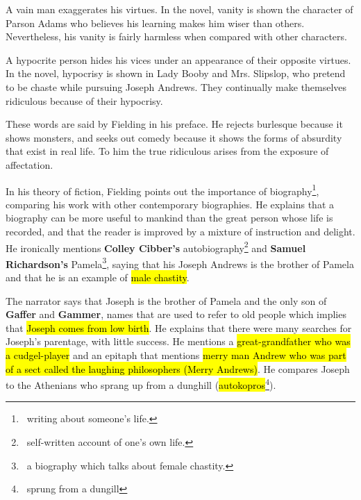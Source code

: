 \documentclass[12pt, a4paper]{article}
\begin{document}

\ind A vain man exaggerates his virtues. In the novel, vanity is shown the character of Parson Adams who
believes his learning makes him wiser than  others. Nevertheless, his vanity is fairly 
harmless when compared with other characters.


\restoregeometry


\ind A hypocrite person hides his vices under an appearance of their opposite virtues. 
In the novel, hypocrisy is shown in 
Lady Booby and Mrs. Slipslop, who pretend to be chaste while pursuing Joseph Andrews.
They continually make themselves ridiculous because of their hypocrisy.



These words are said by Fielding in his preface. He rejects burlesque because it shows monsters,
and seeks out comedy because it shows the forms of absurdity that exist in real life. 
To him the true ridiculous arises from the exposure of affectation.



\ind In his theory of fiction, Fielding points out the importance of biography\footnote{
\, writing about someone's life.}, comparing his work with other contemporary biographies.
He explains that a biography can be more useful to mankind than the great person whose
life is recorded, and that the reader is improved by a mixture of instruction and delight.
He ironically mentions \textbf{Colley Cibber's} autobiography\footnote{\, self-written account of one's own life.}
and \textbf{Samuel Richardson's} Pamela\footnote{\, a biography which talks about female chastity.},
saying that his Joseph Andrews is the brother of Pamela and
that he is an example of \hl{male chastity}.




\ind The narrator says that Joseph is the brother of Pamela and the only son of \textbf{Gaffer} and \textbf{Gammer},
names that are used to refer to old people which implies that \hl{Joseph comes from low birth}.
He explains that there were many searches for Joseph’s parentage, with little success. He mentions
a \hl{great-grandfather who was a cudgel-player} and an epitaph that mentions \hl{merry man Andrew 
who was part of a sect called the laughing philosophers (Merry Andrews)}. He compares Joseph 
to the Athenians who sprang up from a dunghill (\hl{autokopros}\footnote{\, sprung from a dungill}).
\end{document}
